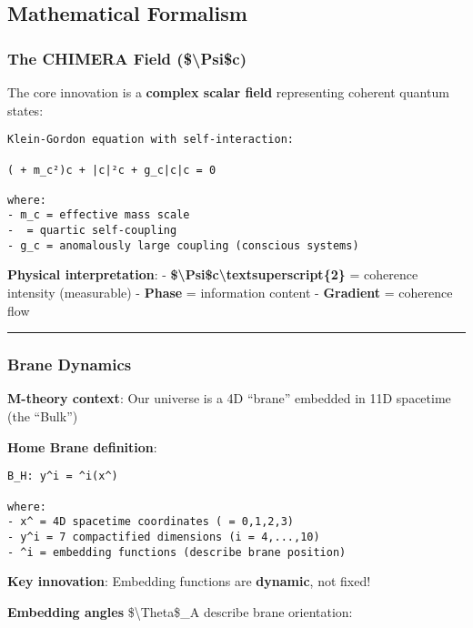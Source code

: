 \subsection{Mathematical Formalism}\label{mathematical-formalism}

\subsubsection{The CHIMERA Field
(\$\textbackslash Psi\$c)}\label{the-chimera-field-ux3c8c}

The core innovation is a \textbf{complex scalar field} representing
coherent quantum states:

\begin{verbatim}
Klein-Gordon equation with self-interaction:

( + m_c²)c + |c|²c + g_c|c|c = 0

where:
- m_c = effective mass scale
-  = quartic self-coupling
- g_c = anomalously large coupling (conscious systems)
\end{verbatim}

\textbf{Physical interpretation}: -
\textbf{\textbar\$\textbackslash Psi\$c\textbar\textbackslash textsuperscript\{2\}}
= coherence intensity (measurable) - \textbf{Phase} = information
content - \textbf{Gradient} = coherence flow

\begin{center}\rule{0.5\linewidth}{0.5pt}\end{center}

\subsubsection{Brane Dynamics}\label{brane-dynamics}

\textbf{M-theory context}: Our universe is a 4D ``brane'' embedded in
11D spacetime (the ``Bulk'')

\textbf{Home Brane definition}:

\begin{verbatim}
B_H: y^i = ^i(x^)

where:
- x^ = 4D spacetime coordinates ( = 0,1,2,3)
- y^i = 7 compactified dimensions (i = 4,...,10)
- ^i = embedding functions (describe brane position)
\end{verbatim}

\textbf{Key innovation}: Embedding functions are \textbf{dynamic}, not
fixed!

\textbf{Embedding angles} \$\textbackslash Theta\$\_A describe brane
orientation:

